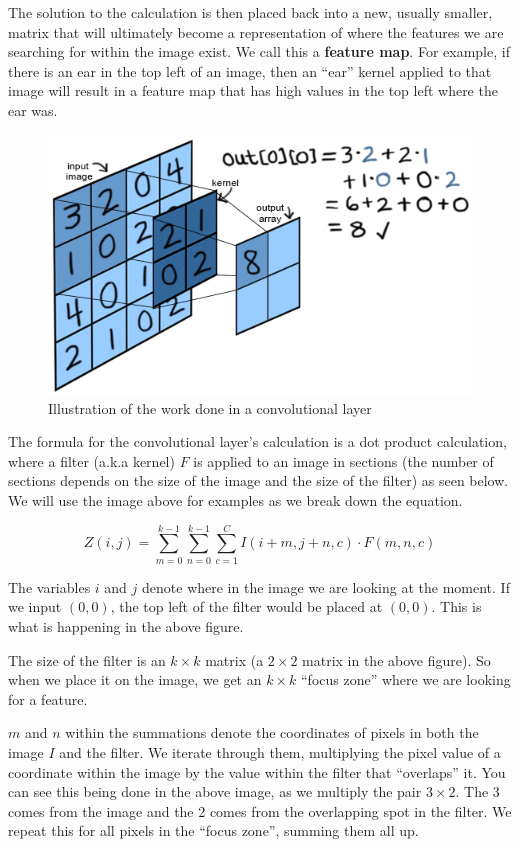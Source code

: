 \begin{flushleft}
        The solution to the calculation is then placed back into a new, usually smaller, matrix that will ultimately become a representation of where the features we are searching for within the image exist. We call this a \textbf{feature map}. For example, if there is an ear in the top left of an image, then an ``ear'' kernel applied to that image will result in a feature map that has high values in the top left where the ear was. 

        \begin{figure}[H]
            \centering
            \includegraphics[width=0.75\linewidth]{cv/imagetokerneltosmallmatrix.png}
            \caption{Illustration of the work done in a convolutional layer}
            \label{fig:imagetokerneltosmallmatrix}
        \end{figure}

        The formula for the convolutional layer's calculation is a dot product calculation, where a filter (a.k.a kernel) $F$ is applied to an image in sections (the number of sections depends on the size of the image and the size of the filter) as seen below. We will use the image above for examples as we break down the equation.
        
        $$Z(i, j) = \sum^{k-1}_{m=0} \sum^{k-1}_{n=0} \sum^{C}_{c=1}  I(i+m, j+n, c) \cdot F(m, n, c) $$
        
        The variables $i$ and $j$ denote where in the image we are looking at the moment. If we input $(0,0)$, the top left of the filter would be placed at $(0,0)$. This is what is happening in the above figure. \break
        
        The size of the filter is an $k \times k$ matrix (a $2 
        \times 2$ matrix in the above figure). So when we place it on the image, we get an $k \times k$ ``focus zone'' where we are looking for a feature. \break
        
        $m$ and $n$ within the summations denote the coordinates of pixels in both the image $I$ and the filter. We iterate through them, multiplying the pixel value of a coordinate within the image by the value within the filter that ``overlaps'' it. You can see this being done in the above image, as we multiply the pair $3 \times 2$. The 3 comes from the image and the 2 comes from the overlapping spot in the filter. We repeat this for all pixels in the ``focus zone'', summing them all up.\break
        

\end{flushleft}

